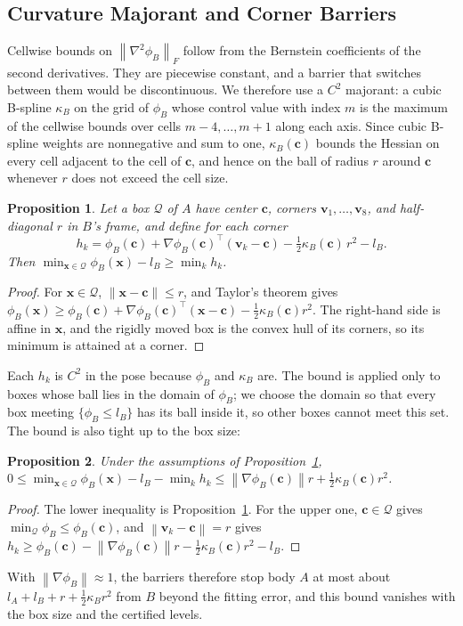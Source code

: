 \documentclass[journal]{IEEEtran}
\newtheorem{proposition}{Proposition}
\theoremstyle{definition}
\newcommand{\norm}[1]{\left\lVert #1\right\rVert}
\begin{document}
\subsection{Curvature Majorant and Corner Barriers}
Cellwise bounds on $\norm{\nabla^2\phi_B}_F$ follow from the Bernstein coefficients of the
second derivatives. They are piecewise constant, and a barrier that switches between them would be
discontinuous. We therefore use a $C^2$ majorant: a cubic B-spline $\kappa_B$ on the grid of $\phi_B$
whose control value with index $m$ is the maximum of the cellwise bounds over cells $m-4,\dots,m+1$
along each axis. Since cubic B-spline weights are nonnegative and sum to one, $\kappa_B(\mathbf c)$
bounds the Hessian on every cell adjacent to the cell of $\mathbf c$, and hence on the ball of
radius $r$ around $\mathbf c$ whenever $r$ does not exceed the cell size.

\begin{proposition}\label{prop:taylor}
Let a box $\mathcal Q$ of $A$ have center $\mathbf c$, corners $\mathbf v_1,\dots,\mathbf v_8$, and
half-diagonal $r$ in $B$'s frame, and define for each corner
\begin{equation}\label{eq:corner}
h_{k}=\phi_B(\mathbf c)+\nabla\phi_B(\mathbf c)^{\top}(\mathbf v_k-\mathbf c)
-\tfrac12\kappa_B(\mathbf c)\,r^2-l_B .
\end{equation}
Then $\min_{\mathbf x\in\mathcal Q}\phi_B(\mathbf x)-l_B\ge\min_kh_k$.
\end{proposition}
\begin{proof}
For $\mathbf x\in\mathcal Q$, $\norm{\mathbf x-\mathbf c}\le r$, and Taylor's theorem gives
$\phi_B(\mathbf x)\ge\phi_B(\mathbf c)+\nabla\phi_B(\mathbf c)^\top(\mathbf x-\mathbf c)
-\tfrac12\kappa_B(\mathbf c)r^2$. The right-hand side is affine in $\mathbf x$, and the rigidly moved
box is the convex hull of its corners, so its minimum is attained at a corner.
\end{proof}
Each $h_k$ is $C^2$ in the pose because $\phi_B$ and $\kappa_B$ are. The bound is applied only to
boxes whose ball lies in the domain of $\phi_B$; we choose the domain so that every box meeting
$\{\phi_B\le l_B\}$ has its ball inside it, so other boxes cannot meet this set. The bound is also
tight up to the box size:
\begin{proposition}\label{prop:tight}
Under the assumptions of Proposition~\ref{prop:taylor},
$0\le\min_{\mathbf x\in\mathcal Q}\phi_B(\mathbf x)-l_B-\min_kh_k\le\norm{\nabla\phi_B(\mathbf c)}r
+\tfrac12\kappa_B(\mathbf c)r^2$.
\end{proposition}
\begin{proof}
The lower inequality is Proposition~\ref{prop:taylor}. For the upper one, $\mathbf c\in\mathcal Q$
gives $\min_{\mathcal Q}\phi_B\le\phi_B(\mathbf c)$, and $\norm{\mathbf v_k-\mathbf c}=r$ gives
$h_k\ge\phi_B(\mathbf c)-\norm{\nabla\phi_B(\mathbf c)}r-\tfrac12\kappa_B(\mathbf c)r^2-l_B$.
\end{proof}
With $\norm{\nabla\phi_B}\approx1$, the barriers therefore stop body $A$ at most about
$l_A+l_B+r+\tfrac12\kappa_Br^2$ from $B$ beyond the fitting error, and this bound vanishes with the
box size and the certified levels.
\end{document}
